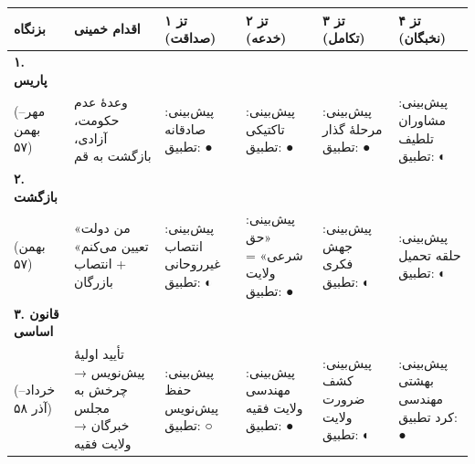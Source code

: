 \documentclass[12pt,a4paper]{book}
\begin{document}
\begin{landscape}

\begin{longtable}{%
    >{\raggedleft\arraybackslash}p{}
    >{\raggedleft\arraybackslash}p{}
    >{\raggedleft\arraybackslash}p{}
    >{\raggedleft\arraybackslash}p{}
    >{\raggedleft\arraybackslash}p{}
    >{\raggedleft\arraybackslash}p{}}
\toprule
\rowcolor{cPrimary!15}
\textbf{بزنگاه} &
\textbf{اقدام خمینی} &
\cellcolor{cGreen!15}\textbf{تز ۱ (صداقت)} &
\cellcolor{cAccent!10}\textbf{تز ۲ (خدعه)} &
\cellcolor{cGold!15}\textbf{تز ۳ (تکامل)} &
\cellcolor{cConsolid!10}\textbf{تز ۴ (نخبگان)} \\
\midrule
\endhead

\textbf{۱. پاریس}{\footnotesize\\ (مهر–بهمن ۵۷)} &
وعدهٔ عدم حکومت، آزادی، بازگشت به قم &
\cellcolor{cGreen!8} پیش‌بینی: صادقانه \newline تطبیق: ● &
\cellcolor{cAccent!5} پیش‌بینی: تاکتیکی \newline تطبیق: ● &
\cellcolor{cGold!8} پیش‌بینی: مرحلهٔ گذار \newline تطبیق: ● &
\cellcolor{cConsolid!5} پیش‌بینی: مشاوران تلطیف \newline تطبیق: ◐ \\
\midrule

\textbf{۲. بازگشت}{\footnotesize\\ (بهمن ۵۷)} &
«من دولت تعیین می‌کنم» + انتصاب بازرگان &
\cellcolor{cGreen!8} پیش‌بینی: انتصاب غیرروحانی \newline تطبیق: ◐ &
\cellcolor{cAccent!5} پیش‌بینی: «حق شرعی» = ولایت \newline تطبیق: ● &
\cellcolor{cGold!8} پیش‌بینی: جهش فکری \newline تطبیق: ◐ &
\cellcolor{cConsolid!5} پیش‌بینی: حلقه تحمیل \newline تطبیق: ◐ \\
\midrule

\textbf{۳. قانون اساسی}{\footnotesize\\ (خرداد–آذر ۵۸)} &
تأیید اولیهٔ پیش‌نویس → چرخش به مجلس خبرگان → ولایت فقیه &
\cellcolor{cGreen!8} پیش‌بینی: حفظ پیش‌نویس \newline تطبیق: ○ &
\cellcolor{cAccent!5} پیش‌بینی: مهندسی ولایت فقیه \newline تطبیق: ● &
\cellcolor{cGold!8} پیش‌بینی: کشف ضرورت ولایت \newline تطبیق: ◐ &
\cellcolor{cConsolid!5} پیش‌بینی: بهشتی مهندسی کرد \newline تطبیق: ● \\
\midrule


\end{longtable}
\end{landscape}
\end{document}
